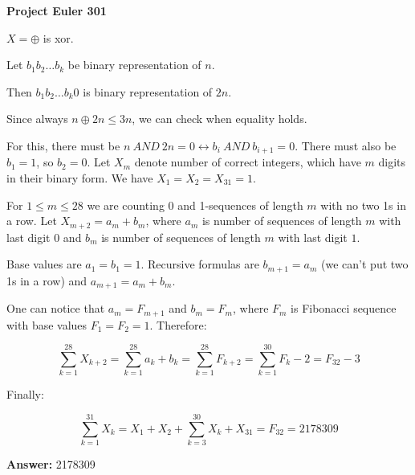 \documentclass[a4paper,12pt]{article}
\begin{document}
\setlength\parindent{0pt}
\textbf{Project Euler 301}
\vspace{5ex}

\(X = \oplus\) is xor.

Let \(b_1 b_2 \dots b_k\) be binary representation of \(n\).

Then \(b_1 b_2 \dots b_k 0\) is binary representation of \(2n\).

Since always \(n \oplus 2n \leq 3n\), we can check when equality holds.

For this, there must be \(n \ AND \ 2n = 0 \leftrightarrow
b_i \ AND \ b_{i + 1} = 0\). There must also be \(b_1 = 1\), so \(b_2 = 0\).
Let \(X_m\) denote number of correct integers, which have \(m\) digits
in their binary form. We have \(X_1 = X_2 = X_{31} = 1\).

For \(1 \leq m \leq 28\) we are counting 0 and 1-sequences of length \(m\)
with no two 1s in a row. Let \(X_{m + 2} = a_m + b_m\),
where \(a_m\) is number of sequences of length \(m\) with last digit \(0\)
and \(b_m\) is number of sequences of length \(m\) with last digit \(1\).

Base values are \(a_1 = b_1 = 1\).
Recursive formulas are \(b_{m + 1} = a_m\) (we can't put two 1s in a row)
and \(a_{m + 1} = a_m + b_m\).

One can notice that \(a_m = F_{m + 1}\) and \(b_m = F_m\), where \(F_m\)
is Fibonacci sequence with base values \(F_1 = F_2 = 1\). Therefore:

\[\sum_{k = 1}^{28} X_{k + 2} = \sum_{k = 1}^{28} a_k + b_k = \sum_{k = 1}^{28} F_{k + 2} =
\sum_{k = 1}^{30} F_k - 2 = F_{32} - 3\]

Finally:

\[\sum_{k = 1}^{31} X_k = X_1 + X_2 + \sum_{k = 3}^{30} X_k + X_{31} = F_{32}
= 2178309\]


\vspace{5ex}
\textbf{Answer:}
2178309
\end{document}
